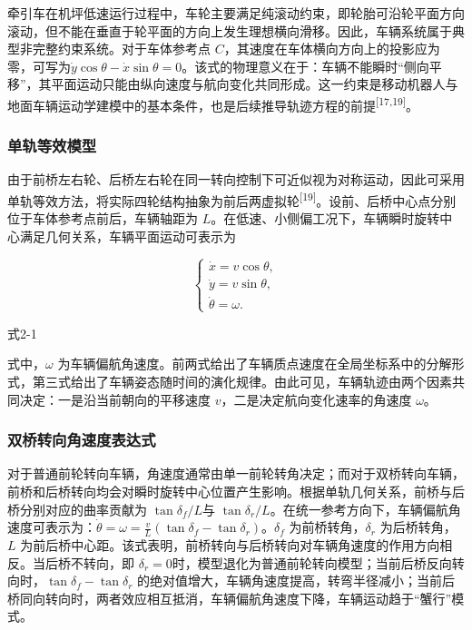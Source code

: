 \documentclass[UTF8,a4paper,12pt]{ctexart}
\begin{document}
牵引车在机坪低速运行过程中，车轮主要满足纯滚动约束，即轮胎可沿轮平面方向滚动，但不能在垂直于轮平面的方向上发生理想横向滑移。因此，车辆系统属于典型非完整约束系统。对于车体参考点 \(C\)，其速度在车体横向方向上的投影应为零，可写为\(\dot{y}\cos\theta - \dot{x}\sin\theta = 0\)。该式的物理意义在于：车辆不能瞬时``侧向平移''，其平面运动只能由纵向速度与航向变化共同形成。这一约束是移动机器人与地面车辆运动学建模中的基本条件，也是后续推导轨迹方程的前提\textsuperscript{[17,19]}。

\subsubsection{单轨等效模型}\label{_Toc229105299}

由于前桥左右轮、后桥左右轮在同一转向控制下可近似视为对称运动，因此可采用单轨等效方法，将实际四轮结构抽象为前后两虚拟轮\textsuperscript{[19]}。设前、后桥中心点分别位于车体参考点前后，车辆轴距为 \(L\)。在低速、小侧偏工况下，车辆瞬时旋转中心满足几何关系，车辆平面运动可表示为

\[
\begin{cases}
\dot{x}=v\cos\theta,\\
\dot{y}=v\sin\theta,\\
\dot{\theta}=\omega.
\end{cases}
\]

式2-1

式中，\(\omega\) 为车辆偏航角速度。前两式给出了车辆质点速度在全局坐标系中的分解形式，第三式给出了车辆姿态随时间的演化规律。由此可见，车辆轨迹由两个因素共同决定：一是沿当前朝向的平移速度 \(v\)，二是决定航向变化速率的角速度 \(\omega\)。

\subsubsection{双桥转向角速度表达式}\label{_Toc229105300}

对于普通前轮转向车辆，角速度通常由单一前轮转角决定；而对于双桥转向车辆，前桥和后桥转向均会对瞬时旋转中心位置产生影响。根据单轨几何关系，前桥与后桥分别对应的曲率贡献为 \(\tan\delta_{f}/L\)与 \(\tan\delta_{r}/L\)。在统一参考方向下，车辆偏航角速度可表示为：\(\dot{\theta} = \omega = \frac{v}{L}\left( \tan\delta_{f} - \tan\delta_{r} \right)。\delta_{f}\) 为前桥转角，\(\delta_{r}\) 为后桥转角，\(L\) 为前后桥中心距。该式表明，前桥转向与后桥转向对车辆角速度的作用方向相反。当后桥不转向，即 \(\delta_{r} = 0\)时，模型退化为普通前轮转向模型；当前后桥反向转向时，\(\tan\delta_{f} - \tan\delta_{r}\) 的绝对值增大，车辆角速度提高，转弯半径减小；当前后桥同向转向时，两者效应相互抵消，车辆偏航角速度下降，车辆运动趋于``蟹行''模式。
\end{document}
